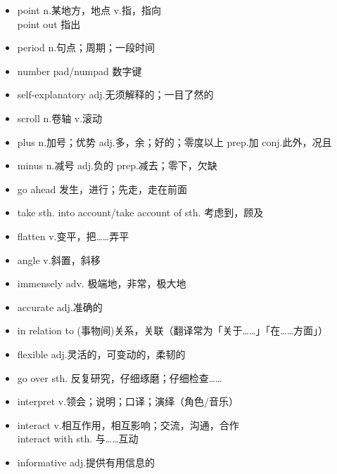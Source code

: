 \begin{multicols}{2}
\begin{itemize}
        \item point n.某地方，地点 v.指，指向\\point out 指出
        \item period n.句点；周期；一段时间
        \item number pad/numpad 数字键
        \item self-explanatory adj.无须解释的；一目了然的
        \item scroll n.卷轴 v.滚动
        \item plus n.加号；优势 adj.多，余；好的；零度以上 prep.加 conj.此外，况且
        \item minus n.减号 adj.负的 prep.减去；零下，欠缺
        \item go ahead 发生，进行；先走，走在前面
        \item take sth. into account/take account of sth. 考虑到，顾及
        \item flatten v.变平，把……弄平
        \item angle v.斜置，斜移
        \item immensely adv. 极端地，非常，极大地
        \item accurate adj.准确的
        \item in relation to (事物间)关系，关联（翻译常为「关于……」「在……方面」）
        \item flexible adj.灵活的，可变动的，柔韧的
        \item go over sth. 反复研究，仔细琢磨；仔细检查……
        \item interpret v.领会；说明；口译；演绎（角色/音乐）
        \item interact v.相互作用，相互影响；交流，沟通，合作\\interact with sth. 与……互动
        \item informative adj.提供有用信息的
    \end{itemize}
\end{multicols}
